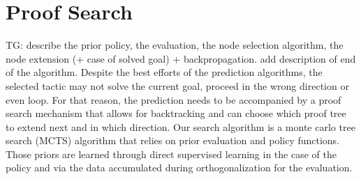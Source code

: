 \documentclass[runningheads,a4paper,draft]{svjour3}
\begin{document}
  
%
%
%
%
%
%
%
%
%



\section{Proof Search}\label{sec:proofsearch}
\todo
{
TG:
describe the prior policy, the evaluation, 
the node selection algorithm,
the node extension (+ case of solved goal) + backpropagation.
add description of end of the algorithm.
}
Despite the best efforts of the prediction algorithms, the selected tactic may 
not solve the current goal, proceed in the wrong direction
or even loop. For that reason, the prediction needs to be accompanied by a  
proof search mechanism that allows for backtracking and 
can choose which proof tree to extend next and in which direction.
Our search algorithm is a monte carlo tree search (MCTS) algorithm that relies 
on prior evaluation and policy functions. Those priors are learned through 
direct supervised learning in the case of the policy and via the data 
accumulated during orthogonalization for the evaluation.
\end{document}
